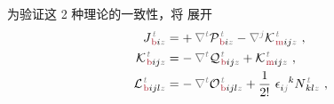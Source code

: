 为验证这 2 种理论的一致性，将  展开
\begin{subequations} \label{eq:JKL}
\begin{align}
	{J}^{\;\!\mathcolor{gray}{t}}_{\;\!\textcolor{Maroon}{\text{b}} i \mathcolor{gray}{z}} &=+\hspace{0.2em} \mathcolor{gray}{\nabla^t} {\mathcal{P}}^{\;\!\mathcolor{gray}{t}}_{\;\!\textcolor{Maroon}{\text{b}} i \mathcolor{gray}{z}} - \mathcolor{gray}{\nabla^j} {\mathcal{K}}^{\;\!\mathcolor{gray}{t}}_{\;\!\textcolor{Maroon}{\text{m}} ij \mathcolor{gray}{z}}~, \label{eq:Jb} \\
	{\mathcal{K}}^{\;\!\mathcolor{gray}{t}}_{\;\!\textcolor{Maroon}{\text{b}} ij \mathcolor{gray}{z}} &= -\hspace{0.2em} \mathcolor{gray}{\nabla^t} {\mathcal{Q}}^{\;\!\mathcolor{gray}{t}}_{\;\!\textcolor{Maroon}{\text{b}} ij \mathcolor{gray}{z}} + {\mathcal{K}}^{\;\!\mathcolor{gray}{t}}_{\;\!\textcolor{Maroon}{\text{m}} ij \mathcolor{gray}{z}}~, \label{eq:Kb} \\
	{\mathcal{L}}^{\;\!\mathcolor{gray}{t}}_{\;\!\textcolor{Maroon}{\text{b}} ijl \mathcolor{gray}{z}} &= -\hspace{0.2em} \mathcolor{gray}{\nabla^t} {\mathcal{O}}^{\;\!\mathcolor{gray}{t}}_{\;\!\textcolor{Maroon}{\text{b}} ijl \mathcolor{gray}{z}} + \frac{1}{2!}~ \epsilon^{\hphantom{ij}k}_{i \mathcolor{gray}{j}} N^{\;\!\mathcolor{gray}{t}}_{\;\! kl\mathcolor{gray}{z}}~, \label{eq:Lb}
\end{align}
\end{subequations}
